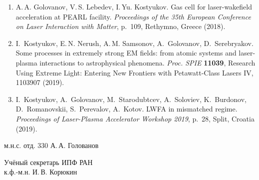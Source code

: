 \documentclass[12pt,a4paper]{scrartcl}
\begin{document}
\begin{enumerate}[parsep=0em, itemsep=0.3em]
\item{A.\,A. Golovanov, V.\,S. Lebedev, I.\,Yu. Kostyukov. Gas cell for laser-wakefield acceleration at PEARL facility. \textit{Proceedings of the 35th European Conference on Laser Interaction with Matter}, p.~109, Rethymno, Greece (2018).}
\item{I.~Kostyukov, E.\,N. Nerush, A.\,M. Samsonov, A.~Golovanov, D.~Serebryakov. Some processes in extremely strong EM fields: from atomic systems and laser-plasma interactions to astrophysical phenomena. \textit{Proc. SPIE} \textbf{11039}, Research Using Extreme Light: Entering New Frontiers with Petawatt-Class Lasers IV, 1103907 (2019).}
\item{I.~Kostyukov, A.~Golovanov, M.~Starodubtcev, A.~Soloviev, K.~Burdonov, D.~Romanovskii, S.~Perevalov, A.~Kotov. LWFA in mismatched regime. \textit{Proceedings of Laser-Plasma Accelerator Workshop 2019}, p.~28, Split, Croatia (2019).}
\end{enumerate}

\vspace{1em}

\noindent м.н.с. отд. 330 \hfill А.\,А. Голованов

\vspace{2.2em}

\noindent Учёный секретарь ИПФ РАН\\
к.ф.-м.н. \hfill И.\,В. Корюкин
\end{document}
